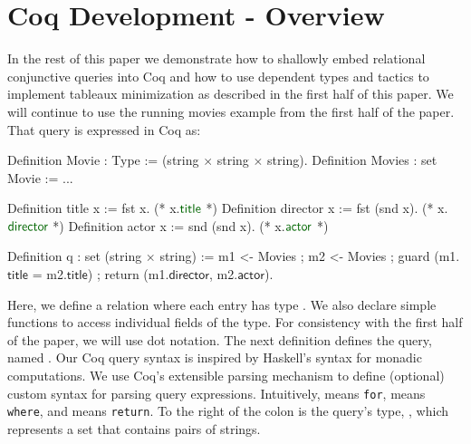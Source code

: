 \documentclass[preprint]{sigplanconf}
\begin{document}
\section{Coq Development - Overview}

In the rest of this paper we demonstrate how to shallowly embed relational conjunctive queries into Coq and how to use dependent types and tactics to implement tableaux minimization as described in the first half of this paper.  We will continue to use the running movies example from the first half of the paper.  That query is expressed in Coq as:
\begin{coq}
Definition Movie : Type := (string $\times$ string $\times$ string).
Definition Movies : set Movie := ...

Definition title x := fst x. (* x.$\textcolor{dkgreen}{\textsf{title}}$ *)
Definition director x := fst (snd x). (* x.$\textcolor{dkgreen}{\textsf{director}}$ *)
Definition actor x := snd (snd x). (* x.$\textcolor{dkgreen}{\textsf{actor}}$ *)

Definition q : set (string $\times$ string) :=
  m1 <- Movies ; m2 <- Movies ;
  guard (m1.$\textsf{title}$ = m2.$\textsf{title}$) ;
  return (m1.$\textsf{director}$, m2.$\textsf{actor}$).
\end{coq}
Here, we define a relation  where each entry has type .
We also declare simple functions to access individual fields of the  type. For consistency with the first half of the paper, we will use dot notation.
The next definition defines the query, named .  Our Coq query syntax is inspired by Haskell's syntax for monadic computations.
We use Coq's extensible parsing mechanism to define (optional) custom syntax for parsing query expressions. Intuitively, \coqe{<-} means {\tt for},  means {\tt where}, and  means {\tt return}.  To the right of the colon is the query's type, , which represents a set that contains pairs of strings.
\end{document}
